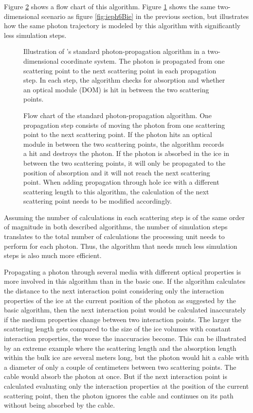 Figure \ref{fig:Ar0vai8u} shows a flow chart of this algorithm. Figure
\ref{fig:oheeL3ai} shows the same two-dimensional scenario as figure
\ref{fig:ieph6Bie} in the previous section, but illustrates how the same
photon trajectory is modeled by this algorithm with significantly less
simulation steps.

\begin{figure}[htbp]
  \caption{Illustration of \icecube's standard photon-propagation algorithm in a two-dimensional coordinate system. The photon is propagated from one scattering point to the next scattering point in each propagation step. In each step, the algorithm checks for absorption and whether an optical module (DOM) is hit in between the two scattering points.}
  \label{fig:oheeL3ai}
\end{figure}

\begin{figure}[p]
  \caption{Flow chart of the standard photon-propagation algorithm. One propagation step consists of moving the photon from one scattering point to the next scattering point. If the photon hits an optical module in between the two scattering points, the algorithm records a hit and destroys the photon. If the photon is absorbed in the ice in between the two scattering points, it will only be propagated to the position of absorption and it will not reach the next scattering point. When adding propagation through hole ice with a different scattering length to this algorithm, the calculation of the next scattering point needs to be modified accordingly.}
  \label{fig:Ar0vai8u}
\end{figure}

Assuming the number of calculations in each scattering step is of the
same order of magnitude in both described algorithms, the number of
simulation steps translates to the total number of calculations the
processing unit needs to perform for each photon. Thus, the algorithm
that needs much less simulation steps is also much more efficient.

Propagating a photon through several media with different optical
properties is more involved in this algorithm than in the basic one. If
the algorithm calculates the distance to the next interaction point
considering only the interaction properties of the ice at the current
position of the photon as suggested by the basic algorithm, then the
next interaction point would be calculated inaccurately if the medium
properties change between two interaction points. The larger the
scattering length gets compared to the size of the ice volumes with
constant interaction properties, the worse the inaccuracies become. This
can be illustrated by an extreme example where the scattering length and
the absorption length within the bulk ice are several meters long, but
the photon would hit a cable with a diameter of only a couple of
centimeters between two scattering points. The cable would absorb the
photon at once. But if the next interaction point is calculated
evaluating only the interaction properties at the position of the
current scattering point, then the photon ignores the cable and
continues on its path without being absorbed by the cable.


